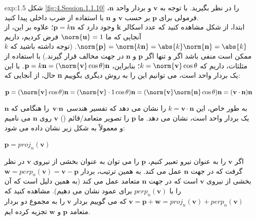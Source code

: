 {\begin{spacing}{1.5}
        \textbf{\vspace{-20pt}}
        \begin{example}{exp:1.5}
            شکل \ref{fig:4.Session.1.1.10} را در نظر بگیرید.
            با توجه به $\textbf{v}$ و بردار واحد $\textbf{n}$، فرمولی برای $\textbf{p}$ بر حسب $\textbf{v}$ و $\textbf{n}$ با استفاده از ضرب داخلی پیدا کنید. \\
            ابتدا، از شکل مشاهده کنید که عدد اسکالر $\textbf{k}$ وجود دارد
            که $\textbf{p}=k\textbf{n}$؛ علاوه بر این، از آنجایی که ما $\norm{\textbf{u}}=1$ فرض کردیم،
            داریم $\norm{\textbf{p}}=\norm{k\textbf{n}}=\abs{k}\norm{\textbf{n}}=\abs{k}$.
            (توجه داشته باشید که $k$ ممکن است منفی باشد اگر و تنها اگر $\textbf{p}$ و $\textbf{n}$ در جهت مخالف قرار گیرند.)
            با استفاده از مثلثات، داریم که $k=\norm{\textbf{v}}\cos\theta$؛
            بنابراین، $\textbf{p}=k\textbf{n}=(\norm{\textbf{v}}\cos\theta)\textbf{n}$.
            با این حال، از آنجایی که \textbf{n} یک بردار واحد است، می توانیم این را به روش دیگری بگوییم:

            \begin{center}
                $\textbf{p}=(\norm{\textbf{v}}\cos\theta)\textbf{n}=(\norm{\textbf{v}}\cdot 1\cos\theta)\textbf{n}=(\norm{\textbf{v}}\norm{\textbf{n}}\cos\theta)\textbf{n}=(\textbf{v}\cdot\textbf{n})\textbf{n}$
            \end{center}

            به طور خاص، این $k=\textbf{v}\cdot\textbf{n}$ را نشان می دهد که تفسیر هندسی $\textbf{v}\cdot\textbf{n}$ را هنگامی که $\textbf{n}$ یک بردار واحد است، نشان می دهد. ما $\textbf{p}$ را تصویر متعامد/قائم () $\textbf{v}$ روی $\textbf{n}$ می نامیم و معمولاً به شکل زیر نشان داده می شود:

            \begin{center}
                $\textbf{p}=proj_{n}(\textbf{v})$
            \end{center}

            اگر $\textbf{v}$ را به عنوان نیرو تعبیر کنیم، $\textbf{p}$ را می توان به عنوان بخشی از نیروی $\textbf{v}$ در نظر گرفت که در جهت $\textbf{n}$ عمل می کند.
            به همین ترتیب، بردار $\textbf{w}=perp_{n}(\textbf{v})=\textbf{v}-\textbf{p}$ بخشی از نیروی $\textbf{v}$ است که در جهت $\textbf{n}$ متعامد عمل می کند
            (به همین دلیل است که آن را با $perp_{n}(\textbf{v})$ برای عمود نشان می دهیم).
            مشاهده کنید که $\textbf{v}=\textbf{p}+\textbf{w}=proj_{n}(\textbf{v})+perp_{n}(\textbf{v})$ که می گوییم بردار $\textbf{v}$ را به مجموع دو بردار متعامد $\textbf{p}$ و $\textbf{w}$ تجزیه کرده ایم.


\end{example}
\end{spacing}}
